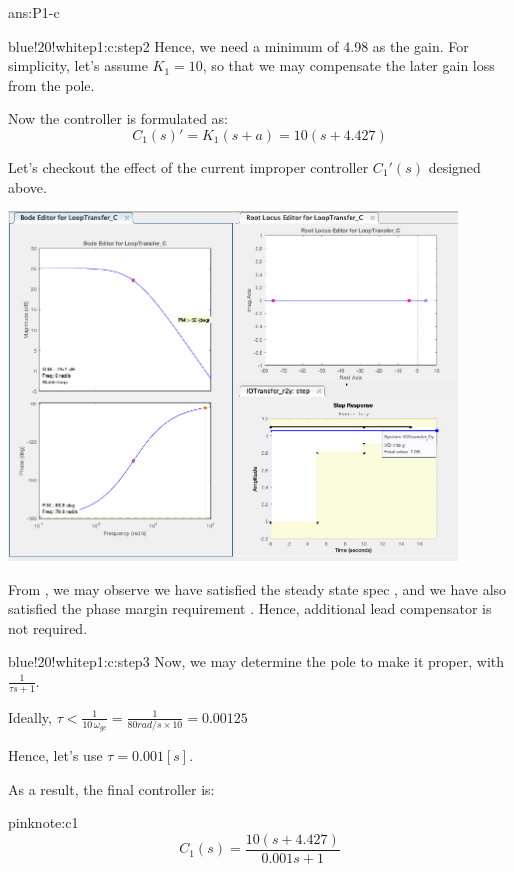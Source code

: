 \documentclass{tron}
\begin{document}
\begin{answer}{ans:P1-c}
\begin{note}{blue!20!white}{p1:c:step2}
		Hence, we need a minimum of 4.98 as the gain. For simplicity, let's assume $K_1 = 10$, so that we may compensate the later gain loss from the pole.
		
		Now the controller is formulated as:
		\begin{equation}
			C_1(s)' = K_1 (s + a) = 10 (s + 4.427) \label{eqn:c1:gain}
		\end{equation}
	\end{note}
	
	Let's checkout the effect of the current improper controller $C_1'(s)$ designed above. 
	
	{	
		\centering
		\includegraphics[width=450px]{Fig/sisotool-c1-zero.png}
    }
	
	From , we may observe we have satisfied the steady state spec , and we have also satisfied the phase margin requirement . Hence, additional lead compensator is not required. 
	
	\begin{note}{blue!20!white}{p1:c:step3}
		Now, we may determine the pole to make it proper, with $\frac{1}{\tau s + 1}$. 
		
		Ideally, $\tau < \frac{1}{10\, \omega_{gc}} = \frac1{80 \unit{rad/s} \times 10} = 0.00125$ 
		
		Hence, let's use $\tau = 0.001 [s]$.
	\end{note}
	
	As a result, the final controller is:
	
	\begin{note}{pink}{note:c1}
		\begin{equation}
			C_1(s) = \frac{10 (s + 4.427)}{0.001 s + 1} \label{eqn:c1}
		\end{equation}		
	\end{note}


\end{answer}
\end{document}
